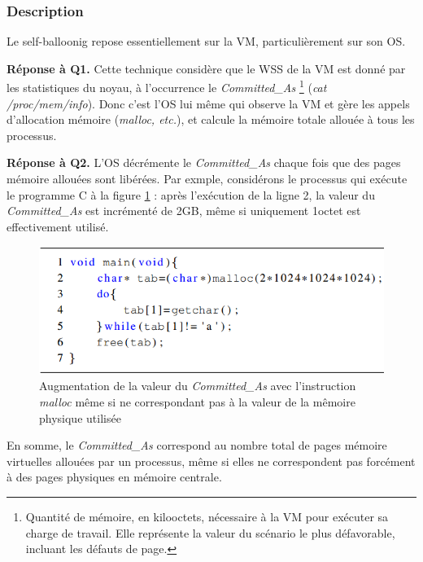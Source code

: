 \subsubsection{Description}
Le self-balloonig \cite{online6} repose essentiellement sur la VM, particulièrement sur son \acs{OS}.  
\par{\textbf{Réponse à Q1.}} Cette technique considère que le \acs{WSS} de la VM est donné par les statistiques du noyau, à l'occurrence le \textit{Committed\_As}\cite{online7, online8} \footnote{Quantité de mémoire, en kilooctets, nécessaire à la VM pour exécuter sa charge de travail. Elle représente la valeur du scénario le plus défavorable, incluant les défauts de page.} (\textit{cat /proc/mem/info}). Donc c'est l'OS lui même qui observe la VM et gère les appels d'allocation mémoire (\textit{malloc, etc.}), et calcule la mémoire totale allouée à tous les processus.
\par{\textbf{Réponse à Q2.}} L'OS décrémente le \textit{Committed\_As} chaque fois que des pages mémoire allouées sont libérées. Par exmple, considérons le processus qui exécute le programme C à la figure \ref{fig:exempl_prog_c} : après l'exécution de la ligne 2, la valeur du \textit{Committed\_As} est incrémenté de 2GB, même si uniquement 1octet est effectivement utilisé.

\begin{figure}[htp]
    \centering
    \includegraphics[scale=.65]{chapters/2/fig2/prog_c}
    \caption{Augmentation de la valeur du \textit{Committed\_As} avec l'instruction \textit{malloc} même si ne correspondant pas à la valeur de la mêmoire physique utilisée}
    \label{fig:exempl_prog_c}
\end{figure}

\noindent En somme, le \textit{Committed\_As} correspond au nombre total de pages mémoire virtuelles allouées par un processus, même si elles ne correspondent pas forcément à des pages physiques en mémoire centrale.

